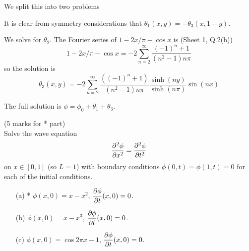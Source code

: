 \documentclass[12pt]{article}
\begin{document}
\begin{answer}
\begin{enumerate}
We split this into two problems

\begin{center}
 
\end{center}

It is clear from symmetry considerations that $\theta_1(x,y)=-\theta_3(x,1-y)$.

We solve for $\theta_2$. The Fourier series of $1-2x/\pi-\cos x$ is (Sheet 1, Q.2(b))
\[1-2x/\pi-\cos x=-2\sum_{n=2}^{\infty}\frac{(-1)^n+1}{(n^2-1)n\pi}\]
so the solution is
\[\theta_3(x,y)=-2\sum_{n=2}^{\infty}\frac{((-1)^n+1)}{(n^2-1)n\pi}\frac{\sinh(ny)}{\sinh(n\pi)}\sin(nx)\]

The full solution is $\phi=\phi_0+\theta_1+\theta_3$.
\end{enumerate}
\end{answer}
\newpage

\bigskip


\begin{question}(5 marks for * part)\\
Solve the wave equation
\[\dfrac{\partial^2 \phi}{\partial x^2}=\dfrac{\partial^2 \phi}{\partial t^2}\]
on $x\in [0,1]$ (so $L=1$) with boundary conditions $\phi(0,t)=\phi(1,t)=0$ for each of the initial conditions.
\begin{enumerate}
\item[(a)] * $\phi(x,0)=x-x^2$, $\dfrac{\partial \phi}{\partial t}(x,0)=0$.
\item[(b)] $\phi(x,0)=x-x^3$, $\dfrac{\partial \phi}{\partial t}(x,0)=0$.
\item[(c)] $\phi(x,0)=\cos 2\pi x-1$, $\dfrac{\partial \phi}{\partial t}(x,0)=0$.
\end{enumerate}

\end{question}
\end{document}
